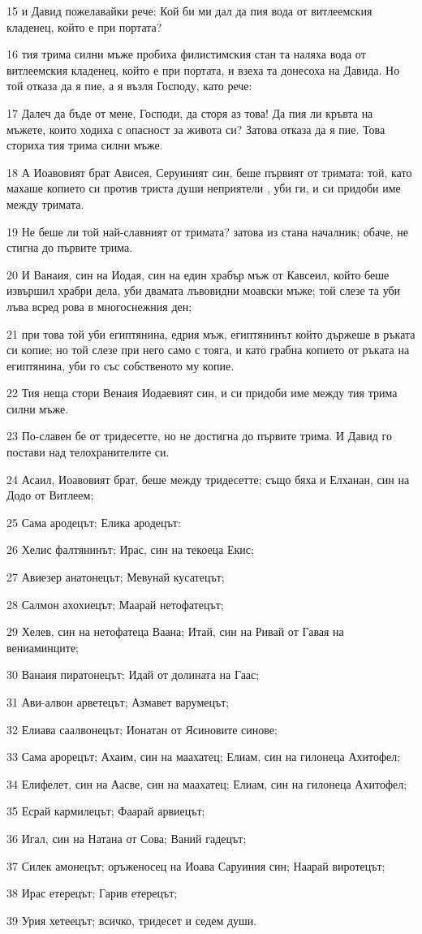 \par 15 и Давид пожелавайки рече: Кой би ми дал да пия вода от витлеемския кладенец, който е при портата?
\par 16 тия трима силни мъже пробиха филистимския стан та наляха вода от витлеемския кладенец, който е при портата, и взеха та донесоха на Давида. Но той отказа да я пие, а я възля Господу, като рече:
\par 17 Далеч да бъде от мене, Господи, да сторя аз това! Да пия ли кръвта на мъжете, които ходиха с опасност за живота си? Затова отказа да я пие. Това сториха тия трима силни мъже.
\par 18 А Иоавовият брат Ависея, Серуиният син, беше първият от тримата: той, като махаше копието си против триста души неприятели , уби ги, и си придоби име между тримата.
\par 19 Не беше ли той най-славният от тримата? затова из стана началник; обаче, не стигна до първите трима.
\par 20 И Ванаия, син на Иодая, син на един храбър мъж от Кавсеил, който беше извършил храбри дела, уби двамата лъвовидни моавски мъже; той слезе та уби лъва всред рова в многоснежния ден;
\par 21 при това той уби египтянина, едрия мъж, египтянинът който държеше в ръката си копие; но той слезе при него само с тояга, и като грабна копието от ръката на египтянина, уби го със собственото му копие.
\par 22 Тия неща стори Венаия Иодаевият син, и си придоби име между тия трима силни мъже.
\par 23 По-славен бе от тридесетте, но не достигна до първите трима. И Давид го постави над телохранителите си.
\par 24 Асаил, Иоавовият брат, беше между тридесетте; също бяха и Елханан, син на Додо от Витлеем;
\par 25 Сама ародецът; Елика ародецът:
\par 26 Хелис фалтянинът; Ирас, син на текоеца Екис;
\par 27 Авиезер анатонецът; Мевунай кусатецът;
\par 28 Салмон ахохиецът; Маарай нетофатецът;
\par 29 Хелев, син на нетофатеца Ваана; Итай, син на Ривай от Гавая на вениаминците;
\par 30 Ванаия пиратонецът; Идай от долината на Гаас;
\par 31 Ави-алвон арветецът; Азмавет варумецът;
\par 32 Елиава саалвонецът; Ионатан от Ясиновите синове;
\par 33 Сама арорецът; Ахаим, син на маахатец; Елиам, син на гилонеца Ахитофел;
\par 34 Елифелет, син на Аасве, син на маахатец; Елиам, син на гилонеца Ахитофел;
\par 35 Есрай кармилецът; Фаарай арвиецът;
\par 36 Игал, син на Натана от Сова; Ваний гадецът;
\par 37 Силек амонецът; оръженосец на Иоава Саруиния син; Наарай виротецът;
\par 38 Ирас етерецът; Гарив етерецът;
\par 39 Урия хетеецът; всичко, тридесет и седем души.

